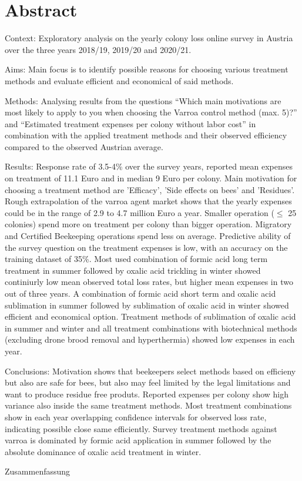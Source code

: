 \chapter*{Abstract}
\label{sec:abstract}
\vspace*{-10mm}

Context:
Exploratory analysis on the yearly colony loss online survey in Austria over the three years 2018/19, 2019/20 and 2020/21.

Aims:
Main focus is to identify possible reasons for choosing various treatment methods and evaluate efficient and economical of said methods.

Methods:
Analysing results from the questions \enquote{Which main motivations are most likely to apply to you when choosing the Varroa control method (max. 5)?} and \enquote{Estimated treatment expenses per colony without labor cost} in combination with the applied treatment methods and their observed efficiency compared to the observed Austrian average.

Results:
Response rate of 3.5-4\% over the survey years, reported mean expenses on treatment of 11.1 Euro and in median 9 Euro per colony. Main motivation for choosing a treatment method are 'Efficacy', 'Side effects on bees' and 'Residues'. Rough extrapolation of the varroa agent market shows that the yearly expenses could be in the range of 2.9 to 4.7 million Euro a year. Smaller operation ($\leq$ 25 colonies) spend more on treatment per colony than bigger operation. Migratory and Certified Beekeeping operations spend less on average. Predictive ability of the survey question on the treatment expenses is low, with an accuracy on the training dataset of 35\%. Most used combination of formic acid long term treatment in summer followed by oxalic acid trickling in winter showed continiurly low mean observed total loss rates, but higher mean expenses in two out of three years. A combination of formic acid short term and oxalic acid sublimation in summer followed by sublimation of oxalic acid in winter showed efficient and economical option. Treatment methods of sublimation of oxalic acid in summer and winter and all treatment combinations with biotechnical methods (excluding drone brood removal and hyperthermia) showed low expenses in each year.

Conclusions:
Motivation shows that beekeepers select methods based on efficieny but also are safe for bees, but also may feel limited by the legal limitations and want to produce residue free produts. Reported expenses per colony show high variance also inside the same treatment methods. Most treatment combinations show in each year overlapping confidence intervals for observed loss rate, indicating possible close same efficiently. Survey treatment methods against varroa is dominated by formic acid application in summer followed by the absolute dominance of oxalic acid treatment in winter.

\vspace*{20mm}

{Zusammenfassung}
\label{sec:Zusammenfassung}

\blindtext
